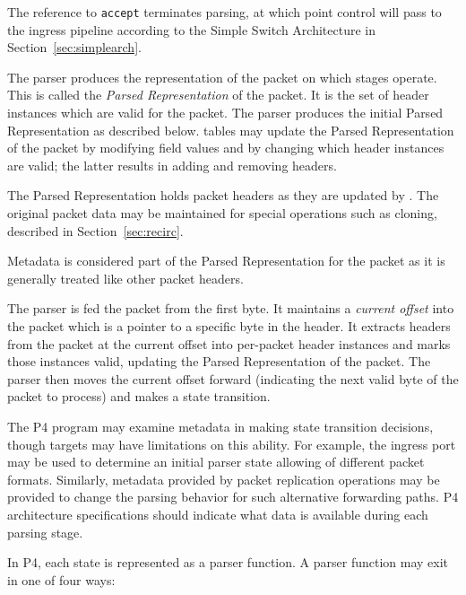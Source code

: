 \documentclass[12pt]{article}
\begin{document}
The reference to \texttt{accept} terminates parsing, at which point control
will pass to the ingress \matchaction pipeline according to the
Simple Switch Architecture in Section~\ref{sec:simplearch}.


The parser produces the representation of the packet on which \matchaction
stages operate. This is called the \textit{Parsed Representation} of the packet.
It is the set of header instances which are valid for the packet. The parser
produces the initial Parsed Representation as described below. \Matchaction
tables may update the Parsed Representation of the packet by modifying field
values and by changing which header instances are valid; the latter results in
adding and removing headers.

The Parsed Representation holds packet headers as they are updated by \matchaction. 
The original packet data may be maintained for special operations such as 
cloning, described in Section~\ref{sec:recirc}.

Metadata is considered part of the Parsed Representation for the packet as 
it is generally treated like other packet headers.


The parser is fed the packet from the first byte. It maintains a \textit{current 
offset} into the packet which is a pointer to a specific byte in the header. It 
extracts headers from the packet at the current offset into per-packet header 
instances and marks those instances valid, updating the Parsed Representation 
of the packet. The parser then moves the current offset forward (indicating 
the next valid byte of the packet to process) and makes a state transition.

The P4 program may examine metadata in making state transition decisions, 
though targets may have limitations on this ability.  For example, the ingress 
port may be used to determine an initial parser state allowing of different 
packet formats. Similarly, metadata provided by packet replication operations
may be provided to change the parsing behavior for such alternative forwarding
paths. P4 architecture specifications should indicate what data is available
during each parsing stage.

In P4, each state is represented as a parser function. A parser function may 
exit in one of four ways:
\end{document}
